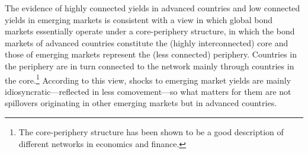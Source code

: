 \begin{appendices}
The evidence of highly connected yields in advanced countries and low connected yields in emerging markets %
is consistent with a view %
in which global bond markets essentially operate under a core-periphery structure, in which the bond markets of advanced countries constitute the (highly interconnected) core and those of emerging markets represent the (less connected) periphery.
Countries in the periphery are in turn connected to the network mainly through countries in the core.\footnote{ The core-periphery structure has been shown to be a good description of different networks in economics and finance.} %
According to this view, shocks to emerging market yields are mainly idiosyncratic---reflected in less comovement---so
what matters for them %
are not spillovers originating in other emerging markets but in advanced countries.


\end{appendices}
